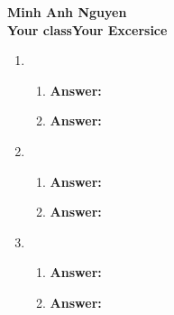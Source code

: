 \documentclass[12pt]{article}
\begin{document}
\textbf{Minh Anh Nguyen }\\
\textbf{Your class\hfill Your Excersice}

\hrulefill

\begin{enumerate}

  \item
        \begin{enumerate}
          \item

                \textbf{Answer:}

          \item

                \textbf{Answer:}

        \end{enumerate}

  \item
        \begin{enumerate}
          \item

                \textbf{Answer:}

          \item

                \textbf{Answer:}

        \end{enumerate}

  \item
        \begin{enumerate}
          \item

                \textbf{Answer:}

          \item

                \textbf{Answer:}

        \end{enumerate}

\end{enumerate}
\end{document}
